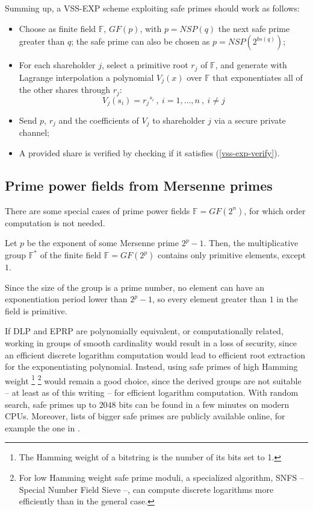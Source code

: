 \documentclass[10pt,journal,cspaper,compsoc]{IEEEtran}
\begin{document}
Summing up, a VSS-EXP scheme exploiting safe primes should work as follows:

\begin{itemize}
\item Choose as finite field $\mathbb{F}$, $GF(p)$, with $p=NSP(q)$ the next safe prime greater than $q$; the safe prime can also be chosen as ${p=NSP(2^{bs(q)})}$;
\item For each shareholder $j$, select a primitive root $r_j$ of $\mathbb{F}$, and generate with Lagrange interpolation a polynomial $V_j(x)$ over $\mathbb{F}$ that exponentiates all of the other shares through $r_j$:
\begin{equation}
\label{vss-exp-verify}
V_j(s_i) = {r_j}^{s_i}~,~i=1,\ldots,n~,~i \neq j
\end{equation}
\item Send $p$, $r_j$ and the coefficients of $V_j$ to shareholder $j$ via a secure private channel;
\item A provided share is verified by checking if it satisfies (\ref{vss-exp-verify}).
\end{itemize}

\subsection{Prime power fields from Mersenne primes}
There are some special cases of prime power fields ${\mathbb{F}=GF(2^n)}$, for which order computation is not needed.
\begin{lem}
Let $p$ be the exponent of some Mersenne prime $2^p-1$. Then, the multiplicative group $\mathbb{F}^*$ of the finite field $\mathbb{F}=GF(2^p)$ contains only primitive elements, except $1$.
\end{lem}
\begin{IEEEproof}
Since the size of the group is a prime number, no element can have an exponentiation period lower than $2^p -1$, so every element greater than $1$ in the field is primitive.
\end{IEEEproof}




\begin{rem}
If DLP and EPRP are polynomially equivalent, or computationally related, working in groups of smooth cardinality would result in a loss of security, since an efficient discrete logarithm computation would lead to efficient root extraction for the exponentiating polynomial. Instead, using safe primes of high Hamming weight \footnote{The Hamming weight of a bitstring is the number of its bits set to 1.} \footnote{For low Hamming weight safe prime moduli, a specialized algorithm, SNFS -- Special Number Field Sieve --, can compute discrete logarithms more efficiently than in the general case.} would remain a good choice, since the derived groups are not suitable -- at least as of this writing -- for efficient logarithm computation.
With random search, safe primes up to $2048$ bits can be found in a few minutes on modern CPUs. Moreover, lists of bigger safe primes are publicly available online, for example the one in \cite{rfc3526}.
\end{rem}
\end{document}
